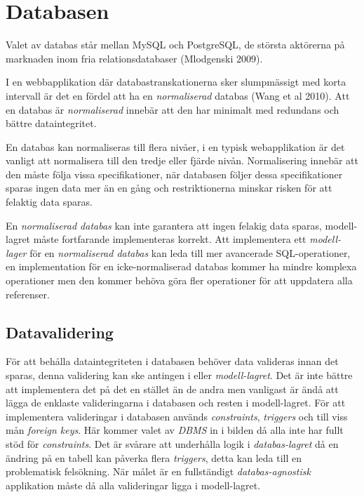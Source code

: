 \section{Databasen}\label{sec:databasen}

Valet av databas står mellan MySQL och PostgreSQL, de största aktörerna på marknaden inom fria relationsdatabaser (Mlodgenski 2009).

I en webbapplikation där databastranskationerna sker slumpmässigt med korta intervall är det en fördel att ha en \emph{normaliserad} databas (Wang et al 2010). Att en databas är \emph{normaliserad} innebär att den har minimalt med redundans och bättre dataintegritet.

En databas kan normaliseras till flera nivåer, i en typisk webapplikation är det vanligt att normalisera till den tredje eller fjärde nivån. Normalisering innebär att den måste följa vissa specifikationer, när databasen följer dessa specifikationer sparas ingen data mer än en gång och restriktionerna minskar risken för att  felaktig data sparas.

En \emph{normaliserad databas} kan inte garantera att ingen felakig data sparas, modell-lagret måste fortfarande implementeras korrekt. Att implementera ett \emph{modell-lager} för en \emph{normaliserad databas} kan leda till mer avancerade SQL-operationer, en implementation för en icke-normaliserad databas kommer ha mindre komplexa operationer men den kommer behöva göra fler operationer för att uppdatera alla referenser.

\subsection{Datavalidering}
För att behålla dataintegriteten i databasen behöver data valideras innan det sparas, denna validering kan ske antingen i  eller \emph{modell-lagret}.
Det är inte bättre att implementera det på det en stället än de andra men vanligast är ändå att lägga de enklaste valideringarna i databasen och resten i modell-lagret. För att implementera valideringar i databasen används \emph{constraints}, \emph{triggers} och till viss mån \emph{foreign keys}. Här kommer valet av \emph{DBMS} in i bilden då alla inte har fullt stöd för \emph{constraints}.
Det är svårare att underhålla logik i \emph{databas-lagret} då en ändring på en tabell kan påverka flera \emph{triggers}, detta kan leda till en problematisk felsökning.
När målet är en fullständigt \emph{databas-agnostisk} applikation måste då alla valideringar ligga i modell-lagret. 

